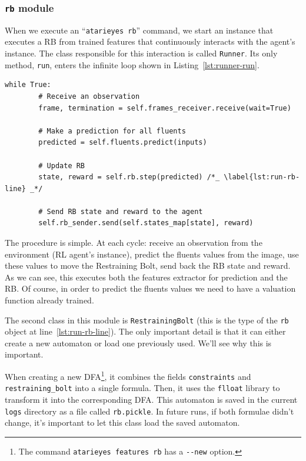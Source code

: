 \subsubsection*{\texttt{rb} module}

When we execute an ``\texttt{atarieyes rb}'' command, we start an instance
that executes a RB from trained features that continuously interacts with the
agent's instance. The class responsible for this interaction is called
\texttt{Runner}. Its only method, \texttt{run}, enters the infinite loop shown
in Listing~\ref{lst:runner-run}.
\begin{lstlisting}[style=floatpy, label=lst:runner-run,%
	caption={Infinite loop of \texttt{Runner.run} in the \texttt{rb} module.}]
while True:
		# Receive an observation
		frame, termination = self.frames_receiver.receive(wait=True)

		# Make a prediction for all fluents
		predicted = self.fluents.predict(inputs)

		# Update RB
		state, reward = self.rb.step(predicted) /*_ \label{lst:run-rb-line} _*/

		# Send RB state and reward to the agent
		self.rb_sender.send(self.states_map[state], reward)
\end{lstlisting}
The procedure is simple. At each cycle: receive an observation from the
environment (RL agent's instance), predict the fluents values from the image,
use these values to move the Restraining Bolt, send back the RB state and
reward. As we can see, this executes both the features extractor for
prediction and the RB. Of course, in order to predict the fluents values we
need to have a valuation function already trained.

The second class in this module is \texttt{RestrainingBolt} (this is the type
of the \texttt{rb} object at line~\ref{lst:run-rb-line}). The only important
detail is that it can either create a new automaton or load one previously
used. We'll see why this is important.

When creating a new DFA\footnote{The command \texttt{atarieyes features rb}
has a \texttt{-{}-new} option.}, it combines the fields \texttt{constraints}
and \texttt{restraining\_bolt} into a single formula. Then, it uses the
\texttt{flloat} library to transform it into the corresponding DFA. This
automaton is saved in the current \texttt{logs} directory as a file called
\verb|rb.pickle|. In future runs, if both formulae didn't change, it's
important to let this class load the saved automaton.

